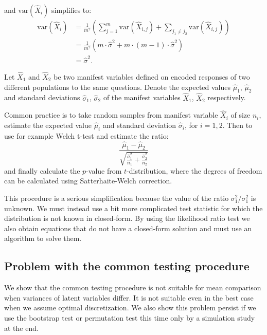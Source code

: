 \documentclass[10pt]{article}
\begin{document}
and $\mathrm{var}(\hat{X}_{i})$ simplifies to:
\begin{align*}
\mathrm{var}(\hat{X}_{i}) &= \frac{1}{m^{2}} \left( \sum_{j=1}^{m} \mathrm{var}(\hat{X}_{i,j}) + \sum_{j_{1} \neq j_{2}} \mathrm{var}(\hat{X}_{i,j}) 
\right) \\
&= \frac{1}{m^{2}} \left(m \cdot \hat{\sigma}^{2} + m \cdot (m-1)\cdot \hat{\sigma}^{2} \right) \\
&= \hat{\sigma}^{2}.
\end{align*}

Let $\hat{X}_{1}$ and $\hat{X}_{2}$ be two manifest variables defined on encoded responses of two different populations to the same questions. Denote the expected values $\hat{\mu}_{1}$, $\hat{\mu}_{2}$ and standard deviations $\hat{\sigma}_{1}$, $\hat{\sigma}_{2}$ of the manifest variables $\hat{X}_{1}$, $\hat{X}_{2}$ respectively. 

Common practice is to take random samples from manifest variable $\hat{X}_{i}$ of size $n_{i}$, estimate the expected value $\hat{\mu}_{i}$ and standard deviation $\hat{\sigma}_{i}$, for $i = 1, 2$. Then to use for example Welch t-test and estimate the ratio:
\begin{equation}
\frac{\hat{\mu}_{1} - \hat{\mu}_{2}}{
\sqrt{\frac{\hat{\sigma}^{2}_{1}}{n_{1}} + \frac{\hat{\sigma}^{2}_{2}}{n_{2}}}
}
\end{equation}
and finally calculate the $p$-value from $t$-distribution, where the degrees of freedom can be calculated using Satterhaite-Welch correction.

This procedure is a serious simplification because the value of the ratio $\sigma_{1}^{2} / \sigma_{1}^{2}$ is unknown. We must instead use a bit more complicated test statistic for which the distribution is not known in closed-form. By using the likelihood ratio test we also obtain equations that do not have a closed-form solution and must use an algorithm to solve them.


\subsection{Problem with the common testing procedure}

We show that the common testing procedure is not suitable for mean comparison when variances of latent variables differ. It is not suitable even in the best case when we assume optimal discretization. We also show this problem persist if we use the bootstrap test or permutation test this time only by a simulation study at the end.
\end{document}
